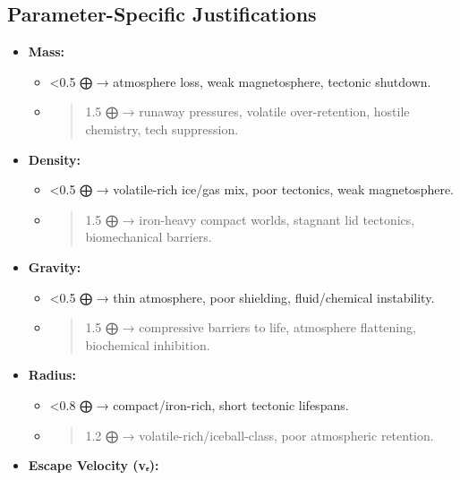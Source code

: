 \documentclass[
  letterpaper,
]{book}
\providecommand{\tightlist}{%
  \setlength{\itemsep}{0pt}\setlength{\parskip}{0pt}}
\begin{document}
\subsection{Parameter-Specific
Justifications}\label{parameter-specific-justifications}

\begin{itemize}
\tightlist
\item
  \textbf{Mass:}

  \begin{itemize}
  \item
    \textless0.5 ⨁ → atmosphere loss, weak magnetosphere, tectonic
    shutdown.\\
  \item
    \begin{quote}
    1.5 ⨁ → runaway pressures, volatile over-retention, hostile
    chemistry, tech suppression.
    \end{quote}
  \end{itemize}
\item
  \textbf{Density:}

  \begin{itemize}
  \item
    \textless0.5 ⨁ → volatile-rich ice/gas mix, poor tectonics, weak
    magnetosphere.\\
  \item
    \begin{quote}
    1.5 ⨁ → iron-heavy compact worlds, stagnant lid tectonics,
    biomechanical barriers.
    \end{quote}
  \end{itemize}
\item
  \textbf{Gravity:}

  \begin{itemize}
  \item
    \textless0.5 ⨁ → thin atmosphere, poor shielding, fluid/chemical
    instability.\\
  \item
    \begin{quote}
    1.5 ⨁ → compressive barriers to life, atmosphere flattening,
    biochemical inhibition.
    \end{quote}
  \end{itemize}
\item
  \textbf{Radius:}

  \begin{itemize}
  \item
    \textless0.8 ⨁ → compact/iron-rich, short tectonic lifespans.\\
  \item
    \begin{quote}
    1.2 ⨁ → volatile-rich/iceball-class, poor atmospheric retention.
    \end{quote}
  \end{itemize}
\item
  \textbf{Escape Velocity (vₑ):}


\end{itemize}
\end{document}
